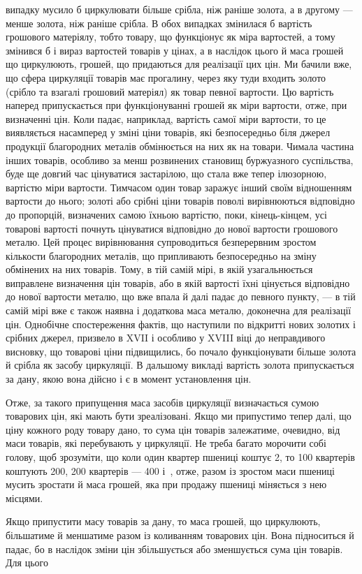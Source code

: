 \parcont{}  %
випадку мусило б циркулювати більше срібла, ніж раніше золота,
а в другому — менше золота, ніж раніше срібла. В обох випадках
змінилася б вартість грошового матеріялу, тобто товару,
що функціонує як міра вартостей, а тому змінився б і вираз
вартостей товарів у цінах, а в наслідок цього й маса грошей
що циркулюють, грошей, що придаються для реалізації цих
цін. Ми бачили вже, що сфера циркуляції товарів має прогалину,
через яку туди входить золото (срібло та взагалі грошовий
матеріял) як товар певної вартости. Цю вартість наперед припускається
при функціонуванні грошей як міри вартости, отже,
при визначенні цін. Коли падає, наприклад, вартість самої міри
вартости, то це виявляється насамперед у зміні ціни товарів,
які безпосередньо біля джерел продукції благородних металів
обмінюється на них як на товари. Чимала частина інших товарів,
особливо за менш розвинених становищ буржуазного суспільства,
буде ще довгий час цінуватися застарілою, що стала вже тепер
ілюзорною, вартістю міри вартости. Тимчасом один товар заражує
інший своїм відношенням вартости до нього; золоті або
срібні ціни товарів поволі вирівнюються відповідно до пропорцій,
визначених самою їхньою вартістю, поки, кінець-кінцем, усі
товарові вартості почнуть цінуватися відповідно до нової вартости
грошового металю. Цей процес вирівнювання супроводиться
безперервним зростом кількости благородних металів, що припливають
безпосередньо на зміну обмінених на них товарів.
Тому, в тій самій мірі, в якій узагальнюється виправлене визначення
цін товарів, або в якій вартості їхні цінується відповідно
до нової вартости металю, що вже впала й далі падає до певного
пункту, — в тій самій мірі вже є також наявна і додаткова
маса металю, доконечна для реалізації цін. Однобічне спостереження
фактів, що наступили по відкритті нових золотих і срібних
джерел, призвело в XVII і особливо у XVIII віці до неправдивого
висновку, що товарові ціни підвищились, бо почало функціонувати
більше золота й срібла як засобу циркуляції. В дальшому
викладі вартість золота припускається за дану, якою вона
дійсно і є в момент установлення цін.

Отже, за такого припущення маса засобів циркуляції визначається
сумою товарових цін, які мають бути зреалізовані. Якщо
ми припустимо тепер далі, що ціну кожного роду товару дано,
то сума цін товарів залежатиме, очевидно, від маси товарів,
які перебувають у циркуляції. Не треба багато морочити собі
голову, щоб зрозуміти, що коли один квартер пшениці коштує
2, то 100 квартерів коштують 200,
200 квартерів — 400 і~, отже, разом
із зростом маси пшениці мусить зростати й маса грошей, яка
при продажу пшениці міняється з нею місцями.

Якщо припустити масу товарів за дану, то маса грошей, що
циркулюють, більшатиме й меншатиме разом із коливанням
товарових цін. Вона підноситься й падає, бо в наслідок зміни
цін збільшується або зменшується сума цін товарів. Для цього
\parbreak{}  %
